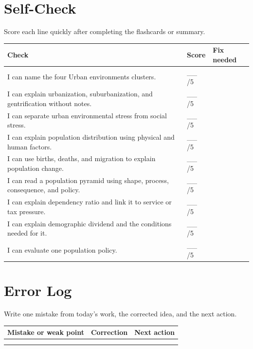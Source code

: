 \documentclass[11pt,a4paper]{article}
\begin{document}
\newpage

\section{Self-Check}

Score each line quickly after completing the flashcards or summary.

\begin{tabularx}{\textwidth}{Y L{0.16\textwidth} L{0.31\textwidth}}
\toprule
\textbf{Check} & \textbf{Score} & \textbf{Fix needed} \\
\midrule
I can name the four Urban environments clusters. & \_\_ /5 & \\
I can explain urbanization, suburbanization, and gentrification without notes. & \_\_ /5 & \\
I can separate urban environmental stress from social stress. & \_\_ /5 & \\
I can explain population distribution using physical and human factors. & \_\_ /5 & \\
I can use births, deaths, and migration to explain population change. & \_\_ /5 & \\
I can read a population pyramid using shape, process, consequence, and policy. & \_\_ /5 & \\
I can explain dependency ratio and link it to service or tax pressure. & \_\_ /5 & \\
I can explain demographic dividend and the conditions needed for it. & \_\_ /5 & \\
I can evaluate one population policy. & \_\_ /5 & \\
\bottomrule
\end{tabularx}

\section{Error Log}

Write one mistake from today's work, the corrected idea, and the next action.

\begin{tabularx}{\textwidth}{Y Y Y}
\toprule
\textbf{Mistake or weak point} & \textbf{Correction} & \textbf{Next action} \\
\midrule
\rule{0pt}{1.2cm} & & \\
\rule{0pt}{1.2cm} & & \\
\bottomrule
\end{tabularx}
\end{document}
